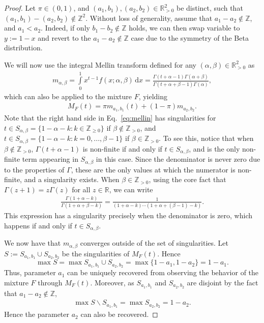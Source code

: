 \documentclass[10pt,a4paper]{amsart}
\begin{document}
\begin{proof}
Let $\pi \in (0,1)$, and $(a_1,b_1),(a_2,b_2)\in \mathbb{R}^2_{>0}$ be distinct, such that $(a_1,b_1)-(a_2,b_2) \notin \mathbb{Z}^2$. Without loss of generality, assume that $a_1-a_2 \notin \mathbb{Z}$, and $a_1<a_2$. Indeed, if only $b_1-b_2 \notin \mathbb{Z}$ holds, we can then swap variable to $y:=1-x$ and revert to the $a_1-a_2 \notin \mathbb{Z}$ case due to the symmetry of the Beta distribution.

We will now use the integral Mellin transform defined for any $(\alpha,\beta)\in \mathbb{R}^2_{>0}$ as
\begin{align}
    m_{\alpha,\beta} = \int\limits_0^1 x^{t-1} f(x;\alpha,\beta)\,\text{d}x = \frac{\Gamma(t+\alpha-1)\Gamma(\alpha+\beta)}{\Gamma(t+\alpha+\beta-1)\Gamma(\alpha)}, \label{eq:mellin}
\end{align}
which can also be applied to the mixture $F$, yielding
\begin{align*}
    M_F(t) = \pi m_{a_1,b_1}(t)+(1-\pi)m_{a_2,b_2}.
\end{align*}
Note that the right hand side in Eq.~\ref{eq:mellin} has singularities for $t \in S_{\alpha,\beta}= \{1-\alpha-k:k \in \mathbb{Z}_{\geq 0}\}$ if $\beta \notin \mathbb{Z}_{>0}$, and $t \in S_{\alpha,\beta}= \{1-\alpha-k:k=0,...,\beta-1\}$ if $\beta \in \mathbb{Z}_{>0}$. To see this, notice that when $\beta \notin \mathbb{Z}_{>0}$, $\Gamma(t+\alpha-1)$ is non-finite if and only if $t \in S_{\alpha,\beta}$, and is the only non-finite term appearing in $S_{\alpha,\beta}$ in this case. Since the denominator is never zero due to the properties of $\Gamma$, these are the only values at which the numerator is non-finite, and a singularity exists. When $\beta \in \mathbb{Z}_{>0}$, using the core fact that $\Gamma(z+1)=z\Gamma(z)$ for all $z \in \mathbb{R}$, we can write 
\begin{align*}
\frac{\Gamma(1+\alpha-k)}{\Gamma(1+\alpha+\beta-k)} = \frac{1}{(1+\alpha-k)\cdots(1+\alpha+(\beta-1)-k)}.
\end{align*}
This expression has a singularity precisely when the denominator is zero, which happens if and only if $t \in S_{\alpha,\beta}$.

We now have that $m_{\alpha,\beta}$ converges outside of the set of singularities. Let $S:=S_{a_1,b_1} \cup S_{a_2,b_2}$ be the singularities of $M_F(t)$. Hence
$$
    \max S = \max S_{a_1,b_1} \cup S_{a_2,b_2}
    = \max \{1-a_1,1-a_2\} = 1-a_1.
$$
Thus, parameter $a_1$ can be uniquely recovered from observing the behavior of the mixture $F$ through $M_F(t)$. Moreover, as $S_{a_1,b_1}$ and $S_{a_2,b_2}$ are disjoint by the fact that $a_1-a_2 \notin \mathbb{Z}$, 
\begin{align*}
    \max S\backslash S_{a_1,b_1} = \max S_{a_2,b_2} = 1-a_2.
\end{align*}
Hence the parameter $a_2$ can also be recovered.


\end{proof}
\end{document}
